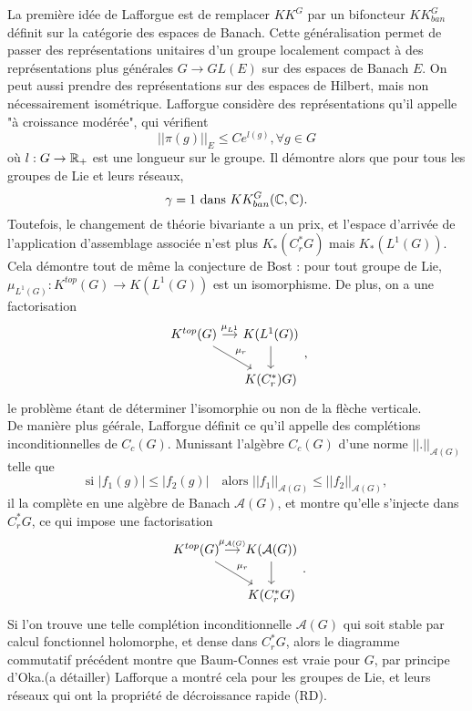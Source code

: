 La première idée de Lafforgue est de remplacer $KK^G$ par un bifoncteur $KK^G_{ban}$ définit sur la catégorie des espaces de Banach. Cette généralisation permet de passer des représentations unitaires d'un groupe localement compact à des représentations plus générales $G\rightarrow GL(E)$ sur des espaces de Banach $E$. On peut aussi prendre des représentations sur des espaces de Hilbert, mais non nécessairement isométrique. Lafforgue considère des représentations qu'il appelle "à croissance modérée", qui vérifient
\[||\pi(g)||_E \leq C e^{l(g)},\forall g\in G\]
où $l:G\rightarrow \mathbb R_+$ est une longueur sur le groupe. Il démontre alors que pour tous les groupes de Lie et leurs réseaux, 
\[\gamma = 1 \ \text{dans }KK^G_{ban}(\C,\C).\]
Toutefois, le changement de théorie bivariante a un prix, et l'espace d'arrivée de l'application d'assemblage associée n'est plus $K_*(C^*_rG)$ mais $K_*(L^1(G))$. Cela démontre tout de même la conjecture de Bost : pour tout groupe de Lie, $\mu_{L^1(G)} : K^{top}(G)\rightarrow K(L^1(G))$ est un isomorphisme. De plus, on a une factorisation 
\[\begin{tikzcd}[column sep = small]
K^{top}(G) \arrow{r}{\mu_{L^1}}\arrow{dr}{\mu_r} & K(L^1(G)) \arrow{d}\\
					& K(C^*_r)G)
\end{tikzcd},\]
le problème étant de déterminer l'isomorphie ou non de la flèche verticale.\\

De manière plus géérale, Lafforgue définit ce qu'il appelle des complétions inconditionnelles de $C_c(G)$. Munissant l'algèbre $C_c(G)$ d'une norme $||.||_{\mathcal A(G)}$ telle que
\[\text{si } |f_1(g)|\leq |f_2(g)|\quad \text{alors } ||f_1||_{\mathcal A(G)}\leq||f_2||_{\mathcal A(G)},\]
il la complète en une algèbre de Banach $\mathcal A(G)$, et montre qu'elle s'injecte dans $C^*_r G$, ce qui impose une factorisation 
\[\begin{tikzcd}[column sep = small]
K^{top}(G) \arrow{r}{\mu_{\mathcal A(G)}}\arrow{dr}{\mu_r} & K(\mathcal A(G)) \arrow{d}\\
					& K(C^*_r G)
\end{tikzcd}.\]
Si l'on trouve une telle complétion inconditionnelle $\mathcal A(G)$ qui soit stable par calcul fonctionnel holomorphe, et dense dans $C^*_r G$, alors le diagramme commutatif précédent montre que Baum-Connes est vraie pour $G$, par principe d'Oka.(a détailler) Lafforque a montré cela pour les groupes de Lie, et leurs réseaux qui ont la propriété de décroissance rapide (RD).\\

